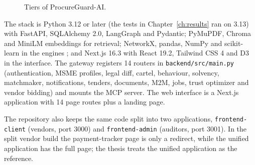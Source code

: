 \begin{figure}[htbp]
\centering
{}
\caption{Tiers of ProcureGuard-AI.}
\label{fig:arch}
\end{figure}

The stack is Python 3.12 or later (the tests in Chapter~\ref{ch:results} ran on 3.13) with FastAPI, SQLAlchemy 2.0, LangGraph and Pydantic; PyMuPDF, Chroma and MiniLM embeddings for retrieval; NetworkX, pandas, NumPy and scikit-learn in the engines \cite{hagberg2008networkx,harris2020array,pedregosa2011scikit}; and Next.js 16.3 with React 19.2, Tailwind CSS 4 and D3 in the interface. The gateway registers 14 routers in \texttt{backend/src/main.py} (authentication, MSME profiles, legal diff, cartel, behaviour, solvency, matchmaker, notifications, tenders, documents, M2M, jobs, trust optimizer and vendor bidding) and mounts the MCP server. The web interface is a Next.js application with 14 page routes plus a landing page.

The repository also keeps the same code split into two applications, \texttt{frontend-client} (vendors, port 3000) and \texttt{frontend-admin} (auditors, port 3001). In the split vendor build the payment-tracker page is only a redirect, while the unified application has the full page; the thesis treats the unified application as the reference.

